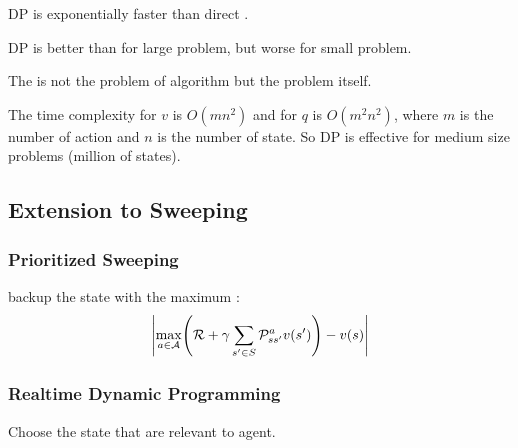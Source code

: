 DP is exponentially faster than direct .

DP is better than  for large problem, but worse for small problem.


The  is not the problem of algorithm but the problem itself.

The time complexity for $v$ is $O(mn^2)$ and for $q$ is $O(m^2 n^2)$, where $m$ is the number of action and $n$ is the number of state. So DP is effective for medium size problems (million of states).

\subsection{Extension to Sweeping}

\subsubsection{Prioritized Sweeping}

backup the state with the maximum :
\begin{equation}
	\mleft| \max_{ a \in \mathcal{A}} \mleft( \mathcal{R}
	+ \gamma \sum_{s' \in S} \mathcal{P}_{ss'}^a v(s') \mright) - v(s) \mright|
\end{equation}

\subsubsection{Realtime Dynamic Programming}

Choose the state that are relevant to agent.

